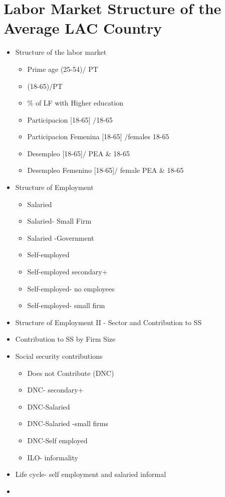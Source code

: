 \documentclass[english]{article}
\begin{document}
\section{Labor Market Structure of the Average LAC Country}
\begin{itemize}
    \item Structure of the labor market 
    \begin{itemize}
        \item Prime age (25-54)$/$ PT
        \item (18-65)$/$PT
        \item \% of LF with Higher education
        \item Participacion [18-65] $/$18-65
        \item Participacion Femenina [18-65] $/$females 18-65
        \item Desempleo [18-65]$/$ PEA \& 18-65
        \item Desempleo Femenino [18-65]$/$ female PEA \& 18-65
        
    \end{itemize}
    \item Structure of Employment
    \begin{itemize}
        \item Salaried
        \item Salaried- Small Firm
        \item Salaried -Government
        \item Self-employed 
        \item Self-employed secondary+
        \item Self-employed- no employees
        \item Self-employed- small firm

        
    \end{itemize}
\item Structure of Employment II - Sector and Contribution to SS
    \item Contribution to SS by Firm Size
        \item Social security contributions
    \begin{itemize}
        \item Does not Contribute (DNC) 
        \item DNC- secondary+
        \item DNC-Salaried
        \item DNC-Salaried -small firms
        \item DNC-Self employed
     
        \item ILO- informality
    \end{itemize}


\item Life cycle- self employment and salaried informal
\item 
\end{itemize}
\end{document}
